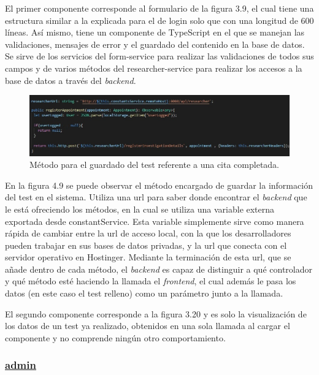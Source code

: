     El primer componente corresponde al formulario de la figura 3.9, el cual tiene una estructura similar a la explicada para el de login solo que con una longitud de 600 líneas. Así mismo, tiene un componente de TypeScript en el que se manejan las validaciones, mensajes de error y el guardado del contenido en la base de datos. Se sirve de los servicios del form-service para realizar las validaciones de todos sus campos y de varios métodos del researcher-service para realizar los accesos a la base de datos a través del \textit{backend}.
    
    \begin{figure}[h]
    \centering
    \includegraphics[width=1\textwidth]{images/registerAppointment.jpg}
    \caption{Método para el guardado del test referente a una cita completada.}
    \end{figure}
    \FloatBarrier
    
    En la figura 4.9 se puede observar el método encargado de guardar la información del test en el sistema. Utiliza una url para saber donde encontrar el \textit{backend} que le está ofreciendo los métodos, en la cual se utiliza una variable externa exportada desde constantService. Esta variable simplemente sirve como manera rápida de cambiar entre la url de acceso local, con la que los desarrolladores pueden trabajar en sus bases de datos privadas, y la url que conecta con el servidor operativo en Hostinger. Mediante la terminación de esta url, que se añade dentro de cada método, el \textit{backend} es capaz de distinguir a qué controlador y qué método esté haciendo la llamada el \textit{frontend}, el cual además le pasa los datos (en este caso el test relleno) como un parámetro junto a la llamada.\newline
    
    El segundo componente corresponde a la figura 3.20 y es solo la visualización de los datos de un test ya realizado, obtenidos en una sola llamada al cargar el componente y no comprende ningún otro comportamiento.\newpage
    
    \subsubsection{\underline{admin}}
    
